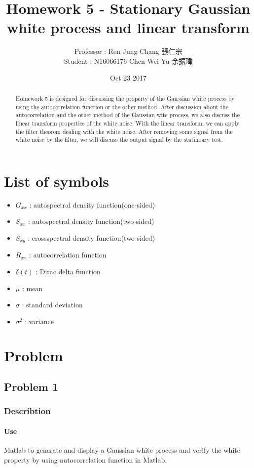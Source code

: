 \documentclass[12pt,a4paper]{article}
\title{Homework 5 - Stationary Gaussian white process and linear transform }
\author{Professor : Ren Jung Chang 張仁宗 \\Student : N16066176 Chen Wei Yu 余振瑋}
\date{Oct 23 2017}
\begin{document}
	\maketitle	 
	\tableofcontents
	\listoffigures
	\begin{abstract}
		Homework 5 is designed for discussing the property of the Gaussian white process by using the autocorrelation function or the other method. After discussion about the autocorrelation and the other method of the Gaussian wite process, we also discuss the linear transform properties of the white noise. With the linear transform, we can apply the filter theorem dealing with the white noise. After removing some signal from the white noise by the filter, we will discuss the output signal by the statinoary test.
	\end{abstract}
	\section{List of symbols}
	\begin{itemize}
		\item $G_{xx}$ : autospectral density function(one-sided)
		\item $S_{xx}$ : autospectral density function(two-sided)
		\item $S_{xy}$ : crossspectral density function(two-sided)
		\item $R_{xx}$ : autocorrelation function
		\item $\delta(t)$ : Dirac delta function
		\item $\mu$ : mean
		\item $\sigma$ : standard deviation
		\item $\sigma^{2}$ : variance
	\end{itemize}
	\section{Problem}
	\subsection{Problem 1}
	\subsubsection{Describtion}
	\paragraph{Use}Matlab to generate and display a Gaussian white process and verify the white property by using autocorrelation function in Matlab.
\end{document}
